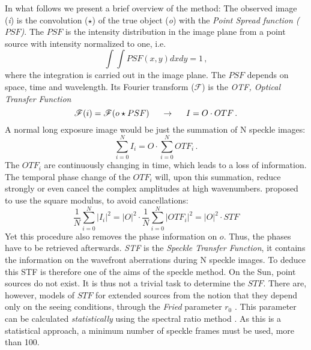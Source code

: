 In what follows we present a brief overview of the method:
The observed image (\emph{i}) is the convolution ($\star$) of the true object (\emph{o}) with the \emph{Point Spread function ($PSF$)}. The $PSF$ is the intensity distribution in the image plane from a point source with intensity normalized to one, i.e. 
\begin{equation}
\int\int PSF (x,y) dx dy = 1 \, ,
\end{equation}
where the integration is carried out in the image plane. The $PSF$ depends on space, time and wavelength. Its Fourier transform ($\mathscr{F}$) is the \emph{OTF, Optical Transfer Function}
\begin{equation}
\mathscr{F} ( i ) = \mathscr{F} (o \star PSF ) \hspace{0.5cm} \rightarrow \hspace{0.5cm} I=O \cdot OTF\, .
\label{ec:obs:obser}
\end{equation}
A normal long exposure image would be just the summation of N speckle images:
\begin{equation}
\sum^{N}_{i=0} I_{i} = O \cdot  \sum^{N}_{i=0} OTF_{i} \, .
\label{ec:obs:long}
\end{equation}
The $OTF_{i}$ are continuously changing in time, which leads to a loss of information. The temporal phase change of the $OTF_{i}$ will, upon this summation, reduce strongly or even cancel the complex amplitudes at high wavenumbers. \cite{1970A&A.....6...85L} proposed to use the square modulus, to avoid cancellations:  
\begin{equation}
\frac{1}{N}\sum^{N}_{i=0} |I_{i}|^2 = |O|^{2} \cdot \frac{1}{N} \sum^{N}_{i=0} |OTF_{i}|^2 =  |O|^2 \cdot STF
\label{ec:obs:stf}
\end{equation}
\noindent
Yet this procedure also removes the phase information on $o$. Thus, the phases have to be retrieved afterwards. \emph{STF} is the \emph{Speckle Transfer Function}, it contains the information on the wavefront aberrations during N speckle images. To deduce this STF is therefore one of the aims of the speckle method. On the Sun, point sources do not exist. It is thus not a trivial task to determine the $STF$. There are, however, models of $STF$ for extended sources from the notion that they  depend only on the seeing conditions, through the \emph{Fried} parameter $r_{0}$ \citep{1973JOSA...63..971K}. This parameter can be calculated \emph{statistically} using the spectral ratio method \citep{von-der-Luehe:1984fk}. As this is a statistical approach, a minimum number of speckle frames must be used, more than 100.

